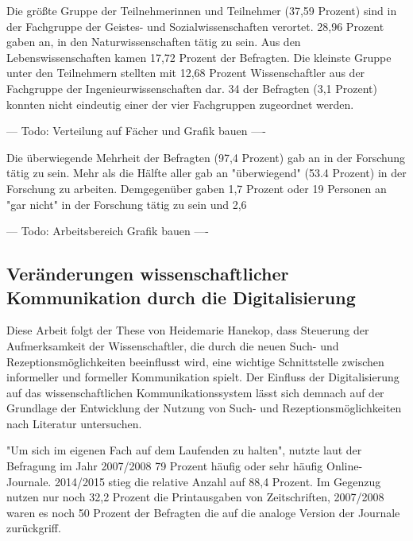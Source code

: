 Die größte Gruppe der Teilnehmerinnen und Teilnehmer (37,59 Prozent) sind in der Fachgruppe der Geistes- und Sozialwissenschaften verortet. 28,96 Prozent gaben an, in den Naturwissenschaften tätig zu sein. Aus den Lebenswissenschaften kamen 17,72 Prozent der Befragten. Die kleinste Gruppe unter den Teilnehmern stellten mit 12,68 Prozent Wissenschaftler aus der Fachgruppe der Ingenieurwissenschaften dar. 34 der Befragten (3,1 Prozent) konnten nicht eindeutig einer der vier Fachgruppen zugeordnet werden.

--- Todo: Verteilung auf Fächer und Grafik bauen ----

Die überwiegende Mehrheit der Befragten (97,4 Prozent) gab an in der Forschung tätig zu sein. Mehr als die Hälfte aller gab an "überwiegend" (53.4 Prozent) in der Forschung zu arbeiten. Demgegenüber gaben 1,7 Prozent oder 19 Personen an "gar nicht" in der Forschung tätig zu sein und 2,6%

--- Todo: Arbeitsbereich Grafik bauen ----

\subsection{Veränderungen wissenschaftlicher Kommunikation durch die Digitalisierung}

Diese Arbeit folgt der These von Heidemarie Hanekop, dass Steuerung der Aufmerksamkeit der Wissenschaftler, die durch die neuen Such- und Rezeptionsmöglichkeiten beeinflusst wird, eine wichtige Schnittstelle zwischen informeller und formeller Kommunikation spielt\cite{Hanekop_2014}. Der Einfluss der Digitalisierung auf das wissenschaftlichen Kommunikationssystem lässt sich demnach auf der Grundlage der Entwicklung der Nutzung von Such- und Rezeptionsmöglichkeiten nach Literatur untersuchen.

"Um sich im eigenen Fach auf dem Laufenden zu halten", nutzte laut der Befragung im Jahr 2007/2008 79 Prozent häufig oder sehr häufig Online-Journale. 2014/2015 stieg die relative Anzahl auf 88,4 Prozent. Im Gegenzug nutzen nur noch 32,2 Prozent die Printausgaben von Zeitschriften, 2007/2008 waren es noch 50 Prozent der Befragten die auf die analoge Version der Journale zurückgriff.

